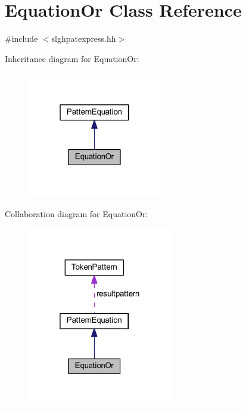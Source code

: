 \hypertarget{class_equation_or}{}\section{Equation\+Or Class Reference}
\label{class_equation_or}


{\ttfamily \#include $<$slghpatexpress.\+hh$>$}



Inheritance diagram for Equation\+Or\+:
\nopagebreak
\begin{figure}[H]
\begin{center}
\leavevmode
\includegraphics[width=166pt]{class_equation_or__inherit__graph}
\end{center}
\end{figure}


Collaboration diagram for Equation\+Or\+:
\nopagebreak
\begin{figure}[H]
\begin{center}
\leavevmode
\includegraphics[width=181pt]{class_equation_or__coll__graph}
\end{center}
\end{figure}
